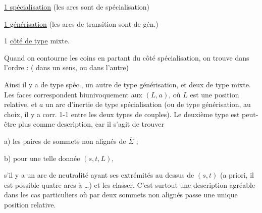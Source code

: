 \uline{1  spécialisation} (les arcs  sont de spécialisation)

\uline{1  générisation} (les arcs de transition sont de gén.)

1 \uline{côté de type} mixte.

Quand on contourne les coins en partant du côté spécialisation, on trouve dans l'ordre :
( dans un sens, ou dans l'autre)

Ainsi il y a  de type spéc., un autre de type générisation, et deux de type mixte. Les faces correspondent biunivoquement aux  $(L,a)$, où $L$ est une position relative, et $a$ un arc  d'inertie de type spécialisation (ou de type générisation, au choix, il y a corr. 1-1 entre les deux types de couples). Le deuxième type est peut-être plus  comme description, car il s'agit de trouver

a) les paires de sommets  non alignés de $\overline\Sigma$ ;

b) pour une telle donnée $(s,t,L)$,

s'il y a un arc de neutralité ayant  ses extrémités au dessus de $(s,t)$ (a priori, il est possible quatre arcs à \ldots) et les classer. C'est surtout une description agréable dans les cas  particuliers où par deux sommets non alignés passe une unique position relative.

